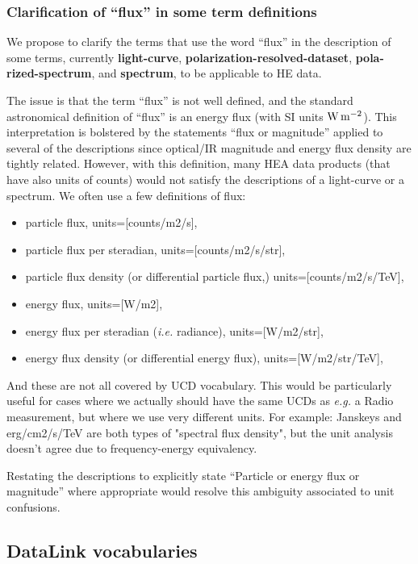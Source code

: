 \documentclass[11pt,a4paper]{ivoa}
\begin{document}


\subsubsection{Clarification of ``flux'' in some term definitions}

We propose to clarify the terms that use the word ``flux'' in the description of some terms, currently {\bf light-curve}, {\bf polarization-resolved-dataset}, {\bf pola-\\rized-spectrum}, and {\bf spectrum}, to be applicable to \gls{HE} data.

The issue is that the term ``flux'' is not well defined, and the standard astronomical definition of ``flux''
is an energy flux (with SI units $\rm W\,m^{-2}$).  This interpretation is bolstered by the statements ``flux or magnitude'' applied to several of the descriptions since optical/IR magnitude and energy flux density are tightly related.  However, with this definition, many \gls{HEA} data products (that have also units of counts) would not satisfy the descriptions of a light-curve or a spectrum. We often use a few definitions of flux:
\begin{itemize}
  \item particle flux, units=[counts/m2/s],
  \item particle flux per steradian, units=[counts/m2/s/str],
  \item particle flux density (or differential particle flux,) units=[counts/m2/s/TeV],
  \item energy flux, units=[W/m2],
  \item energy flux per steradian ({\em i.e.\/} radiance), units=[W/m2/str],
  \item energy flux density (or differential energy flux), units=[W/m2/str/TeV],
\end{itemize}
And these are not all covered by UCD vocabulary. This would be particularly useful for cases where we actually should have the same UCDs as {\em e.g.\/} a Radio measurement, but where we use very different units. For example: Janskeys and erg/cm2/s/TeV are both types of "spectral flux density", but the unit analysis doesn't agree due to frequency-energy equivalency.

Restating the descriptions to explicitly state ``Particle or energy flux or magnitude'' where appropriate would resolve this ambiguity associated to unit confusions.


\subsection{DataLink vocabularies}\label{sec:DLs}
\end{document}
